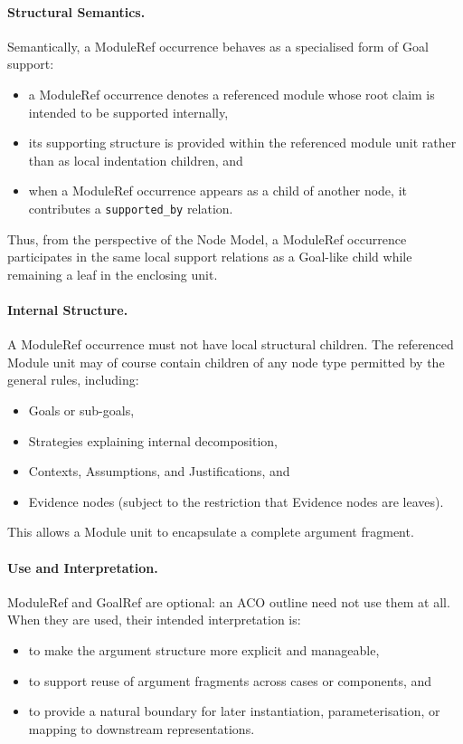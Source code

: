\documentclass[11pt,twoside,a4paper]{article}
\begin{document}
\paragraph{Structural Semantics.}
Semantically, a ModuleRef occurrence behaves as a specialised form of Goal support:
\begin{itemize}[leftmargin=2em]
  \item a ModuleRef occurrence denotes a referenced module whose root claim is intended to be supported internally,
  \item its supporting structure is provided within the referenced module unit rather than as local indentation children, and
  \item when a ModuleRef occurrence appears as a child of another node, it contributes a
        \texttt{supported\_by} relation.
\end{itemize}

Thus, from the perspective of the Node Model, a ModuleRef occurrence participates in the same
local support relations as a Goal-like child while remaining a leaf in the enclosing unit.

\paragraph{Internal Structure.}
A ModuleRef occurrence must not have local structural children. The referenced Module unit may of course contain children of any node type permitted by the general rules,
including:
\begin{itemize}[leftmargin=2em]
  \item Goals or sub-goals,
  \item Strategies explaining internal decomposition,
  \item Contexts, Assumptions, and Justifications, and
  \item Evidence nodes (subject to the restriction that Evidence nodes are leaves).
\end{itemize}

This allows a Module unit to encapsulate a complete argument fragment.

\paragraph{Use and Interpretation.}
ModuleRef and GoalRef are optional: an ACO outline need not use them at all. When they are used,
their intended interpretation is:
\begin{itemize}[leftmargin=2em]
  \item to make the argument structure more explicit and manageable,
  \item to support reuse of argument fragments across cases or components, and
  \item to provide a natural boundary for later instantiation, parameterisation,
        or mapping to downstream representations.
\end{itemize}
\end{document}
